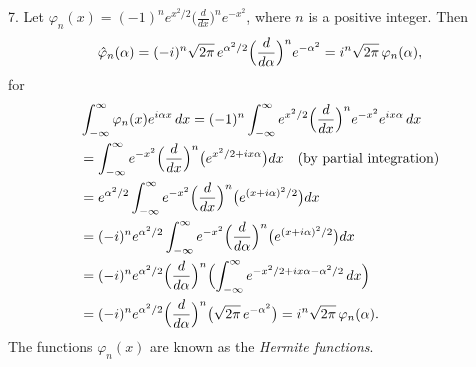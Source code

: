 7. Let $\varphi_n(x)=(-1)^n e^{x^2/2}\bigl(\frac{d}{dx}\bigr)^n e^{-x^2}$, where $n$ is a positive integer. Then
\begin{equation*}
\hat\varphi_n(\alpha)=(-i)^n\sqrt{2\pi}\,e^{\alpha^2/2}\Bigl(\frac{d}{d\alpha}\Bigr)^n e^{-\alpha^2}
=i^n\sqrt{2\pi}\,\varphi_n(\alpha),
\end{equation*}
for
\begin{align*}
&\int_{-\infty}^{\infty}\varphi_n(x)e^{i\alpha x}\,dx
=(-1)^n\int_{-\infty}^{\infty}e^{x^2/2}\Bigl(\frac{d}{dx}\Bigr)^n e^{-x^2}e^{ix\alpha}\,dx\\
&=\int_{-\infty}^{\infty}e^{-x^2}\Bigl(\frac{d}{dx}\Bigr)^n\bigl(e^{x^2/2+ix\alpha}\bigr)dx
\quad\text{(by partial integration)}\\
&=e^{\alpha^2/2}\int_{-\infty}^{\infty}e^{-x^2}\Bigl(\frac{d}{dx}\Bigr)^n\bigl(e^{(x+i\alpha)^2/2}\bigr)dx\\
&=(-i)^n e^{\alpha^2/2}\int_{-\infty}^{\infty}e^{-x^2}\Bigl(\frac{d}{d\alpha}\Bigr)^n\bigl(e^{(x+i\alpha)^2/2}\bigr)dx\\
&=(-i)^n e^{\alpha^2/2}\Bigl(\frac{d}{d\alpha}\Bigr)^n
\Bigl(\int_{-\infty}^{\infty}e^{-x^2/2+ix\alpha-\alpha^2/2}\,dx\Bigr)\\
&=(-i)^n e^{\alpha^2/2}\Bigl(\frac{d}{d\alpha}\Bigr)^n\bigl(\sqrt{2\pi}\,e^{-\alpha^2}\bigr)
=i^n\sqrt{2\pi}\,\varphi_n(\alpha).
\end{align*}
The functions $\varphi_n(x)$ are known as the \emph{Hermite functions}.


